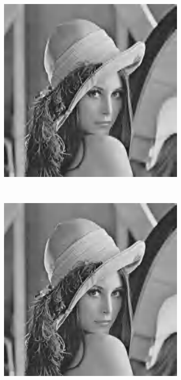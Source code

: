 \documentclass{article}
\begin{document}
\begin{figure}[htbp]
\begin{subfigure}{.19\textwidth}
    \end{subfigure}
    \begin{subfigure}{.19\textwidth}
        \includegraphics[width=\linewidth]{img/jpeg2000/40.jpg}
    \end{subfigure}\\
    \begin{subfigure}{.19\textwidth}
        \includegraphics[width=\linewidth]{img/jpeg2000/50.jpg}

\end{subfigure}
\end{figure}
\end{document}
